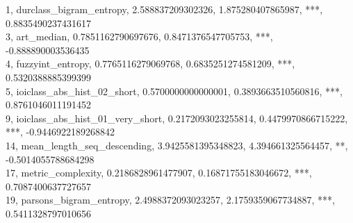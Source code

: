1, durclass_bigram_entropy, 2.588837209302326, 1.875280407865987, ***, 0.8835490237431617\\
3, art_median, 0.7851162790697676, 0.8471376547705753, ***, -0.888890003536435\\
4, fuzzyint_entropy, 0.7765116279069768, 0.6835251274581209, ***, 0.5320388885399399\\
5, ioiclass_abs_hist_02_short, 0.5700000000000001, 0.3893663510560816, ***, 0.8761046011191452\\
9, ioiclass_abs_hist_01_very_short, 0.2172093023255814, 0.4479970866715222, ***, -0.9446922189268842\\
14, mean_length_seq_descending, 3.9425581395348823, 4.394661325564457, **, -0.5014055788684298\\
17, metric_complexity, 0.2186828961477907, 0.16871755183046672, ***, 0.7087400637727657\\
19, parsons_bigram_entropy, 2.4988372093023257, 2.1759359067734887, ***, 0.5411328797010656\\
